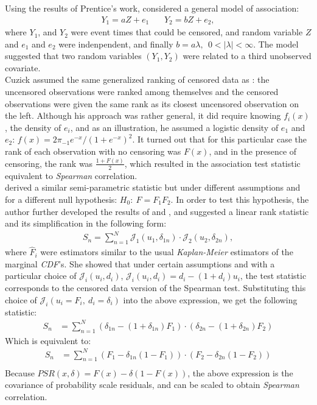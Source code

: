 \documentclass[]{article}
\begin{document}
Using the results of Prentice's work, \cite{cuzick1982rank} considered a general model of association:
	$$
	\begin{aligned}
		Y_1 = aZ + e_1 ~~~~~~~~ Y_2 = bZ + e_2,
	\end{aligned}
	$$
where $Y_1$, and $Y_2$ were event times that could be censored, and random variable $Z$ and $e_1$ and $e_2$ were indenpendent, and finally $b=a\lambda,~~0<|\lambda|<\infty$. The model suggested that two random variables $(Y_1, Y_2)$ were related to a third unobserved covariate.\\
Cuzick assumed the same generalized ranking of censored data as \cite{prentice1978linear}: the uncensored observations were ranked among themselves and the censored observations were given the same rank as its closest uncensored observation on the left. Although his approach was rather general, it did require knowing $f_i(x)$, the density of $e_i$, and as an illustration, he assumed a logistic density of $e_1$ and $e_2$:  $f(x) = 2\pi_{-1} e^{-x}/(1+e^{-x})^2$. It turned out that for this particular case the rank of each observation with no censoring was $F(x)$, and in the presence of censoring, the rank was $\frac{1+F(x)}{2}$, which resulted in the association test statistic equivalent to \emph{Spearman} correlation.\\

\cite{dabrowska1986rank} derived a similar semi-parametric statistic but under different assumptions and for a different null hypothesis: $H_0:~F=F_1 F_2$. In order to test this hypothesis, the author further developed the results of \cite{prentice1978linear} and \cite{cuzick1982rank} , and suggested a linear rank statistic and its simplification in the following form:
	$$
	\begin{aligned}
		 S_n = \sum_{n=1}^N \mathcal{J}_1( u_1, \delta_{1n}) \cdot \mathcal{J}_2( u_2, \delta_{2n}),
	\end{aligned}
	$$
where $\hat{F}_i$ were estimators similar to the usual \emph{Kaplan-Meier} estimators of the marginal \emph{CDF}'s. She showed that under certain assumptions and with a particular choice of $\mathcal{J}_i(u_i,d_i)$, $\mathcal{J}_i(u_i,d_i) =d_i-(1+d_i)u_i$, the test statistic corresponds to the censored data version of the Spearman test. Substituting this choice of $\mathcal{J}_i(u_i=F_i,~d_i=\delta_i)$ into the above expression, we get the following statistic:
	$$
	\begin{aligned}
		 S_n & = \sum_{n=1}^N (\delta_{1n} - (1+\delta_{1n})F_1)\cdot (\delta_{2n} - (1+\delta_{2n})F_2)
	\end{aligned}
	$$
  Which is equivalent to:
	$$
	\begin{aligned}
		 S_n & = \sum_{n=1}^N (F_1 - \delta_{1n}(1-F_1))\cdot (F_2 - \delta_{2n}(1-F_2))\\
	\end{aligned}
	$$
Because $PSR(x, \delta) = F(x)-\delta(1-F(x))$, the above expression is the covariance of probability scale residuals, and can be scaled to obtain \emph{Spearman} correlation.\\
\end{document}
